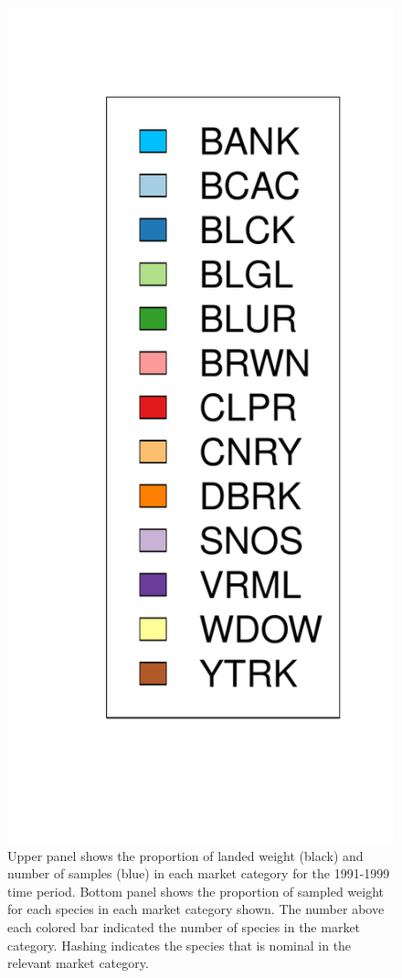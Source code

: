\documentclass[12pt]{article}
\begin{document}
\begin{landscape}
\begin{figure}[h!]
\includegraphics[height=0.8\textheight]{./pictures/barplotLegend.pdf}
\caption{Upper panel shows the proportion of landed weight (black) and number of                 
samples (blue) in each market category for the 1991-1999 time period. Bottom panel 
shows the proportion of sampled weight for each species in each market category 
shown. The number above each colored bar indicated the number of species in 
the market category. Hashing indicates the species that is nominal in the 
relevant market category.}
\label{bar91}
\end{figure}
\end{landscape}
\end{document}
